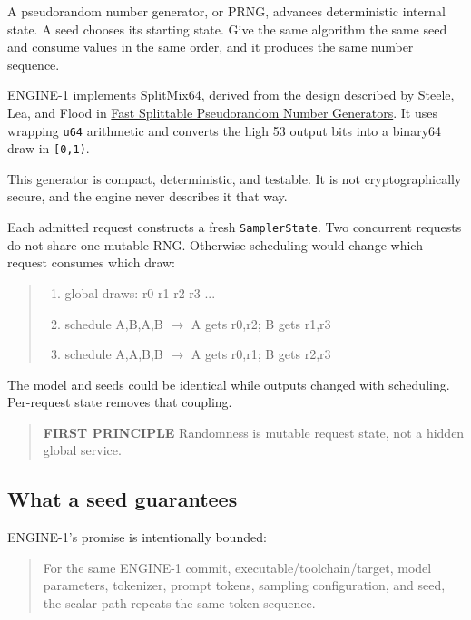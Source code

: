A pseudorandom number generator, or PRNG, advances deterministic
internal state. A seed chooses its starting state. Give the same
algorithm the same seed and consume values in the same order, and it
produces the same number sequence.

ENGINE-1 implements SplitMix64, derived from the design described by
Steele, Lea, and Flood in
\href{https://doi.org/10.1145/2660193.2660195}{Fast Splittable
Pseudorandom Number Generators}. It uses wrapping \texttt{u64}
arithmetic and converts the high 53 output bits into a binary64 draw in
\texttt{{[}0,1)}.

This generator is compact, deterministic, and testable. It is not
cryptographically secure, and the engine never describes it that way.

Each admitted request constructs a fresh \texttt{SamplerState}. Two
concurrent requests do not share one mutable RNG. Otherwise scheduling
would change which request consumes which draw:

\begin{quote}
\begin{enumerate}
\item global draws: r0 r1 r2 r3 ...
\item schedule A,B,A,B  \(\longrightarrow\)  A gets r0,r2; B gets r1,r3
\item schedule A,A,B,B  \(\longrightarrow\)  A gets r0,r1; B gets r2,r3
\end{enumerate}
\end{quote}

The model and seeds could be identical while outputs changed with
scheduling. Per-request state removes that coupling.

\begin{quote}
\textbf{FIRST PRINCIPLE} Randomness is mutable request state, not a
hidden global service.
\end{quote}

\subsection{What a seed guarantees}\label{what-a-seed-guarantees}

ENGINE-1's promise is intentionally bounded:

\begin{quote}
For the same ENGINE-1 commit, executable/toolchain/target, model
parameters, tokenizer, prompt tokens, sampling configuration, and seed,
the scalar path repeats the same token sequence.
\end{quote}

